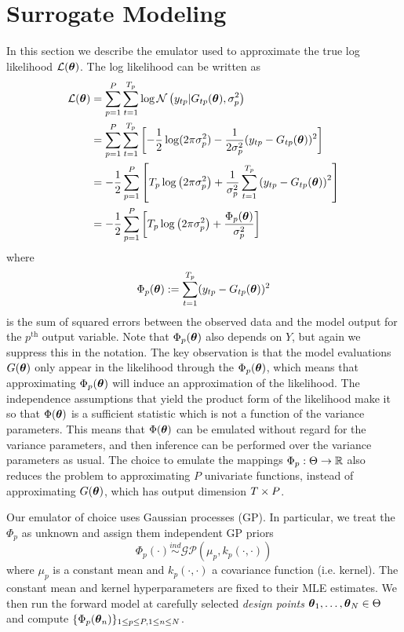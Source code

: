 \documentclass[12pt]{article}
\begin{document}
\section{Surrogate Modeling}
In this section we describe the emulator used to approximate the true log likelihood $\mathcal{L}(\boldsymbol{\theta})$. The log likelihood can be written as 
\begin{align*}
\mathcal{L}(\boldsymbol{\theta}) &= \sum_{p = 1}^{P} \sum_{t = 1}^{T_{p}} \log \mathcal{N}\left(y_{tp}| G_{tp}(\boldsymbol{\theta}), \sigma_p^2 \right) \\
			       &= \sum_{p = 1}^{P}  \sum_{t = 1}^{T_{p}} \left[-\frac{1}{2} \log(2\pi \sigma_p^2) - \frac{1}{2\sigma_p^2} (y_{tp} - G_{tp}(\boldsymbol{\theta}))^2\right]  \\
			       &= -\frac{1}{2} \sum_{p = 1}^{P} \left[T_{p} \log\left(2\pi \sigma_p^2 \right) + \frac{1}{\sigma_p^2}\sum_{t = 1}^{T_{p}} \left(y_{tp} - G_{tp}(\boldsymbol{\theta})\right)^2  \right] \\
			       &= -\frac{1}{2} \sum_{p = 1}^{P} \left[T_{p} \log\left(2\pi \sigma_p^2 \right) + \frac{\Phi_p(\boldsymbol{\theta})}{\sigma_p^2} \right] 
\end{align*}
where 
\[\Phi_p(\boldsymbol{\theta}) := \sum_{t = 1}^{T_{p}} (y_{tp} - G_{tp}(\boldsymbol{\theta}))^2\]
is the sum of squared errors between the observed data and the model output for the $p^{\text{th}}$ output variable. Note that $\Phi_p(\boldsymbol{\theta})$ also depends on $Y$, but again we suppress this in the notation. The key observation 
is that the model evaluations $G(\boldsymbol{\theta})$ only appear in the likelihood through the $\Phi_p(\boldsymbol{\theta})$, which means that approximating $\Phi_p(\boldsymbol{\theta})$ will induce an approximation of the likelihood. The independence assumptions 
that yield the product form of the likelihood make it so that $\Phi(\boldsymbol{\theta})$ is a sufficient statistic which is not a function of the variance parameters. This means that $\Phi(\boldsymbol{\theta})$ can be emulated without regard for the variance parameters, 
and then inference can be performed over the variance parameters as usual. The choice to emulate the mappings $\Phi_p: \Theta \to \mathbb{R}$ also reduces the problem to 
approximating $P$ univariate functions, instead of approximating $G(\boldsymbol{\theta})$, which has output dimension $T \times P$. 

Our emulator of choice uses Gaussian processes (GP). In particular, we treat the $\Phi_p$ as unknown and assign them independent GP priors
\[\Phi_p(\cdot) \overset{ind}{\sim} \mathcal{GP}(\mu_p, k_p(\cdot, \cdot))\] 
where $\mu_p$ is a constant mean and $k_p(\cdot, \cdot)$ a covariance function (i.e. kernel). The constant mean and kernel hyperparameters are fixed to their MLE estimates. We then run the forward model at carefully selected 
\textit{design points} $\boldsymbol{\theta}_1, \dots, \boldsymbol{\theta}_N \in \Theta$ and compute $\{\Phi_p(\boldsymbol{\theta}_n)\}_{1 \leq p \leq P, 1 \leq n \leq N}$. 
\end{document}
